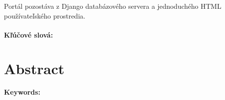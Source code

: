 \documentclass[12pt, oneside]{book}
\begin{document}
Portál pozostáva z Django databázového servera a jednoduchého HTML používateľského prostredia.

\paragraph*{Kľúčové slová:}%


\newpage
\section*{Abstract}



\paragraph*{Keywords:}


%
%



\newpage

\tableofcontents






\mainmatter








%


\end{document}
